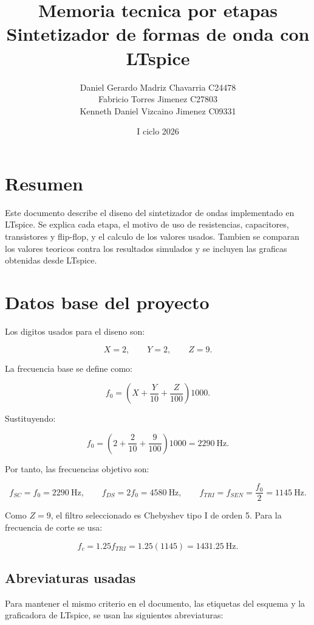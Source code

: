 ﻿\documentclass[11pt,letterpaper]{article}
\title{Memoria tecnica por etapas\\Sintetizador de formas de onda con LTspice}
\author{Daniel Gerardo Madriz Chavarria C24478\\
Fabricio Torres Jimenez C27803\\
Kenneth Daniel Vizcaino Jimenez C09331}
\date{I ciclo 2026}
\begin{document}
\maketitle

\section*{Resumen}

Este documento describe el diseno del sintetizador de ondas implementado en
LTspice. Se explica cada etapa, el motivo de uso de resistencias,
capacitores, transistores y flip-flop, y el calculo de los valores usados.
Tambien se comparan los valores teoricos contra los resultados simulados y se
incluyen las graficas obtenidas desde LTspice.

\section{Datos base del proyecto}

Los digitos usados para el diseno son:

\[
X=2,\qquad Y=2,\qquad Z=9.
\]

La frecuencia base se define como:

\[
f_0=\left(X+\frac{Y}{10}+\frac{Z}{100}\right)1000.
\]

Sustituyendo:

\[
f_0=\left(2+\frac{2}{10}+\frac{9}{100}\right)1000
=2290~\text{Hz}.
\]

Por tanto, las frecuencias objetivo son:

\[
f_{SC}=f_0=2290~\text{Hz},
\qquad
f_{DS}=2f_0=4580~\text{Hz},
\qquad
f_{TRI}=f_{SEN}=\frac{f_0}{2}=1145~\text{Hz}.
\]

Como \(Z=9\), el filtro seleccionado es Chebyshev tipo I de orden 5. Para la
frecuencia de corte se usa:

\[
f_c=1.25f_{TRI}=1.25(1145)=1431.25~\text{Hz}.
\]

\subsection*{Abreviaturas usadas}

Para mantener el mismo criterio en el documento, las etiquetas del esquema y
la graficadora de LTspice, se usan las siguientes abreviaturas:
\end{document}
